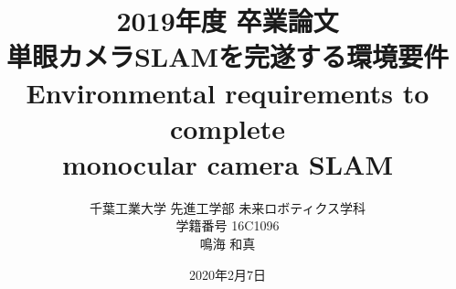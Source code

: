 \documentclass[a4paper,11pt]{jsbook}
\begin{document}
\title{2019年度 卒業論文\\
\vspace{\baselineskip}
単眼カメラSLAMを完遂する環境要件\\
Environmental requirements to complete\\
 monocular camera SLAM }
\author{千葉工業大学 先進工学部 未来ロボティクス学科\\
学籍番号 16C1096\\
鳴海 和真}




\date{2020年2月7日}

\maketitle

\clearpage



\tableofcontents



\cleardoublepage
{}


%









\newpage
\printindex
\end{document}
